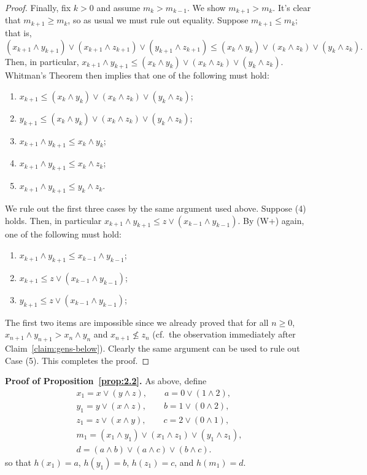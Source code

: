 \begin{proof}
Finally, fix $k> 0$ and assume $m_k > m_{k-1}$.  We show $m_{k+1} > m_k$.
It's clear that $m_{k+1} \geq m_k$, so as usual we must rule out equality.  Suppose
$m_{k+1} \leq m_k$; that is,
\[
(x_{k+1} \wedge y_{k+1}) \vee (x_{k+1} \wedge z_{k+1}) \vee (y_{k+1} \wedge z_{k+1}) \leq
(x_k \wedge y_k) \vee (x_k \wedge z_k) \vee (y_k \wedge z_k).
\]
Then, in particular, $x_{k+1} \wedge y_{k+1} \leq (x_k \wedge y_k) \vee (x_k \wedge z_k) \vee (y_k \wedge z_k)$.
Whitman's Theorem then implies that one of the following must hold:
\begin{enumerate}
\item $x_{k+1}\leq (x_k \wedge y_k) \vee (x_k \wedge z_k) \vee (y_k \wedge z_k)$;
\item $y_{k+1} \leq (x_k \wedge y_k) \vee (x_k \wedge z_k) \vee (y_k \wedge z_k)$;
\item $x_{k+1} \wedge y_{k+1} \leq x_k \wedge y_k$;
\item $x_{k+1} \wedge y_{k+1} \leq x_k \wedge z_k$;
\item $x_{k+1} \wedge y_{k+1} \leq y_k \wedge z_k$.
\end{enumerate}
We rule out the first three cases by the same argument used above.
Suppose (4) holds.  Then, in particular
$x_{k+1} \wedge y_{k+1} \leq z\vee (x_{k-1} \wedge y_{k-1})$.
By (W+) again, one of the following must hold:
\begin{enumerate}
\item $x_{k+1} \wedge y_{k+1} \leq x_{k-1} \wedge y_{k-1}$;
\item $x_{k+1} \leq z\vee (x_{k-1} \wedge y_{k-1})$;
\item $y_{k+1} \leq z\vee (x_{k-1} \wedge y_{k-1})$;
\end{enumerate}
The first two items are impossible since we already proved that for all 
$n\geq 0$, $x_{n+1} \wedge y_{n+1} > x_{n} \wedge y_n$ and  
$x_{n+1} \nleq z_n$ (cf.~the observation immediately after
Claim~\ref{claim:gens-below}). Clearly the same argument can be used 
to rule out Case (5). This completes the proof.
\end{proof}

\noindent \textbf{Proof of Proposition~\ref{prop:2.2}.}
As above, define 
\begin{gather*}
x_1 = x \vee (y \wedge z), \qquad a = 0\vee (1 \wedge 2),\\
y_1 = y \vee (x \wedge z), \qquad b = 1\vee (0 \wedge 2),\\
z_1 = z \vee (x \wedge y), \qquad c = 2\vee (0 \wedge 1),\\
m_1 = (x_1 \wedge y_1) \vee (x_1 \wedge z_1) \vee (y_1 \wedge z_1),\\
d = (a \wedge b) \vee (a \wedge c) \vee (b \wedge c).
\end{gather*}
so that $h(x_1) = a$,  $h(y_1) = b$, $h(z_1) = c$, and $h(m_1) = d$.


